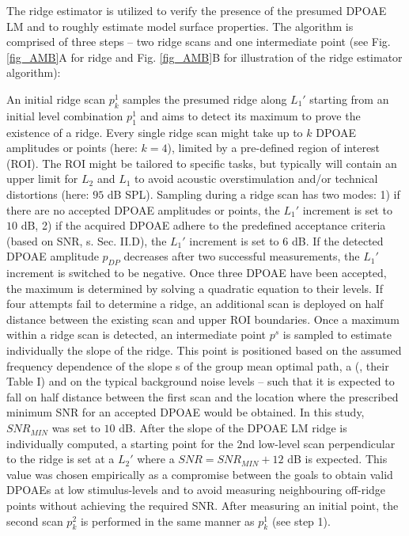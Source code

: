 \documentclass[journal,twoside,web]{ieeecolor2}
\begin{document}
The ridge estimator \cite{ED2017} is utilized to verify the presence of the presumed DPOAE LM and to roughly estimate model surface properties.
The algorithm is comprised of three steps – two ridge scans and one intermediate point (see Fig. \ref{fig_AMB}A for ridge and Fig. \ref{fig_AMB}B for illustration of the ridge estimator algorithm):
\begin{algorithmic}[1]
\STATE An initial ridge scan $p_k^1$ samples the presumed ridge along $L_1'$ starting from an initial level combination $p_1^1$ and aims to detect its maximum to prove the existence of a ridge.
Every single ridge scan might take up to $k$ DPOAE amplitudes or points (here: $k=4$), limited by a pre-defined region of interest (ROI).
The ROI might be tailored to specific tasks, but typically will contain an upper limit for $L_2$ and $L_1$ to avoid acoustic overstimulation and/or technical distortions (here: $95$ dB SPL).
Sampling during a ridge scan has two modes: 1) if there are no accepted DPOAE amplitudes or points, the $L_1'$ increment is set to $10$ dB, 2) if the acquired DPOAE adhere to the predefined acceptance criteria (based on SNR, s. Sec. II.D), the $L_1'$ increment is set to $6$ dB.
If the detected DPOAE amplitude $p_{DP}$ decreases after two successful measurements, the $L_1'$ increment is switched to be negative.
Once three DPOAE have been accepted, the maximum is determined by solving a quadratic equation to their levels.
If four attempts fail to determine a ridge, an additional scan is deployed on half distance between the existing scan and upper ROI boundaries.
\STATE Once a maximum within a ridge scan is detected, an intermediate point $p^s$ is sampled to estimate individually the slope of the ridge.
This point is positioned based on the assumed frequency dependence of the slope s of the group mean optimal path, a (\cite{ZD2020}, their Table I) and on the typical background noise levels – such that it is expected to fall on half distance between the first scan and the location where the prescribed minimum SNR for an accepted DPOAE would be obtained.
In this study, $SNR_{MIN}$ was set to $10$ dB.
\STATE After the slope of the DPOAE LM ridge is individually computed, a starting point for the 2nd low-level scan perpendicular to the ridge is set at a $L_2'$ where a $SNR = SNR_{MIN} + 12$ dB is expected.
This value was chosen empirically as a compromise between the goals to obtain valid DPOAEs at low stimulus-levels and to avoid measuring neighbouring off-ridge points without achieving the required SNR.
After measuring an initial point, the second scan $p_k^2$ is performed in the same manner as $p_k^1$ (see step 1).
\end{algorithmic} 
\end{document}

